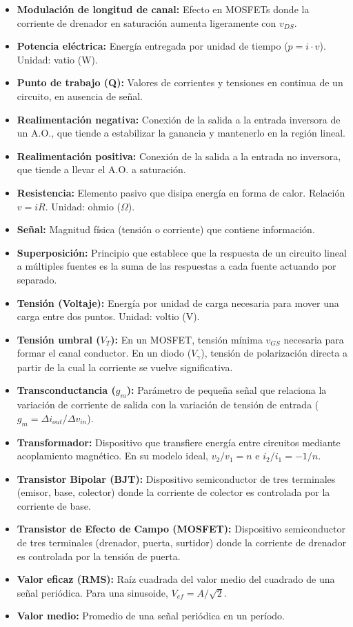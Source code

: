 \documentclass[11pt,a4paper]{article}
\begin{document}
\begin{itemize}[leftmargin=*,topsep=2pt,itemsep=1pt]
  \item \textbf{Modulación de longitud de canal:} Efecto en MOSFETs donde la corriente de drenador en saturación aumenta ligeramente con $v_{DS}$.
  \item \textbf{Potencia eléctrica:} Energía entregada por unidad de tiempo ($p = i \cdot v$). Unidad: vatio (W).
  \item \textbf{Punto de trabajo (Q):} Valores de corrientes y tensiones en continua de un circuito, en ausencia de señal.
  \item \textbf{Realimentación negativa:} Conexión de la salida a la entrada inversora de un A.O., que tiende a estabilizar la ganancia y mantenerlo en la región lineal.
  \item \textbf{Realimentación positiva:} Conexión de la salida a la entrada no inversora, que tiende a llevar el A.O. a saturación.
  \item \textbf{Resistencia:} Elemento pasivo que disipa energía en forma de calor. Relación $v = iR$. Unidad: ohmio ($\Omega$).
  \item \textbf{Señal:} Magnitud física (tensión o corriente) que contiene información.
  \item \textbf{Superposición:} Principio que establece que la respuesta de un circuito lineal a múltiples fuentes es la suma de las respuestas a cada fuente actuando por separado.
  \item \textbf{Tensión (Voltaje):} Energía por unidad de carga necesaria para mover una carga entre dos puntos. Unidad: voltio (V).
  \item \textbf{Tensión umbral ($V_T$):} En un MOSFET, tensión mínima $v_{GS}$ necesaria para formar el canal conductor. En un diodo ($V_\gamma$), tensión de polarización directa a partir de la cual la corriente se vuelve significativa.
  \item \textbf{Transconductancia ($g_m$):} Parámetro de pequeña señal que relaciona la variación de corriente de salida con la variación de tensión de entrada ($g_m = \Delta i_{out} / \Delta v_{in}$).
  \item \textbf{Transformador:} Dispositivo que transfiere energía entre circuitos mediante acoplamiento magnético. En su modelo ideal, $v_2/v_1 = n$ e $i_2/i_1 = -1/n$.
  \item \textbf{Transistor Bipolar (BJT):} Dispositivo semiconductor de tres terminales (emisor, base, colector) donde la corriente de colector es controlada por la corriente de base.
  \item \textbf{Transistor de Efecto de Campo (MOSFET):} Dispositivo semiconductor de tres terminales (drenador, puerta, surtidor) donde la corriente de drenador es controlada por la tensión de puerta.
  \item \textbf{Valor eficaz (RMS):} Raíz cuadrada del valor medio del cuadrado de una señal periódica. Para una sinusoide, $V_{ef} = A/\sqrt{2}$.
  \item \textbf{Valor medio:} Promedio de una señal periódica en un período.
\end{itemize}
\end{document}

